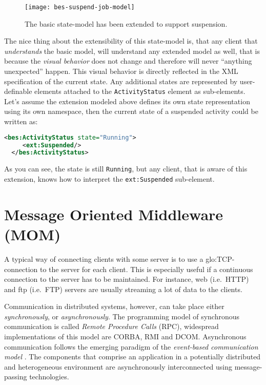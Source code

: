 \begin{figure}[h]
  \centering
  \texttt{[image: bes-suspend-job-model]}
  \caption[Extended  BES Job-State-Model]{The  basic state-model  has been
    extended to support suspension.}
  \label{fig:bes-suspend-model}
\end{figure}

The nice  thing about the extensibility  of this state-model  is, that any
client  that  \emph{understands}  the  basic model,  will  understand  any
extended model  as well, that  is because the \emph{visual  behavior} does
not change  and therefore will never ``anything  unexpected'' happen. This
visual  behavior is  directly reflected  in the  XML specification  of the
current state.   Any additional  states are represented  by user-definable
elements attached to  the \texttt{ActivityStatus} element as sub-elements.
Let's  assume   the  extension  modeled   above  defines  its   own  state
representation  using its  own  namespace,  then the  current  state of  a
suspended activity could be written as:

\begin{lstlisting}[language=XML]
  <bes:ActivityStatus state="Running">
     <ext:Suspended/>
  </bes:ActivityStatus>
\end{lstlisting}

As you can see, the state  is still \texttt{Running}, but any client, that
is   aware    of   this   extension,   knows   how    to   interpret   the
\texttt{ext:Suspended} sub-element.

\section[Message Oriented Middleware]{Message Oriented Middleware (MOM)}
\label{sec:fundamentals:mom}

A  typical  way  of connecting  clients  with  some  server  is to  use  a
\gls{glo:TCP}-connection to the server for each client. This is especially
useful if a continuous connection to  the server has to be maintained. For
instance, web (i.e.~HTTP) and ftp (i.e.~FTP) servers are usually streaming
a lot of data to the clients.

Communication  in  distributed systems,  however,  can  take place  either
\emph{synchronously}, or  \emph{asynchronously}. The programming  model of
synchronous communication  is called \emph{Remote  Procedure Calls} (RPC),
widespread  implementations  of  this  model  are  CORBA,  RMI  and  DCOM.
Asynchronous   communication  follows   the  emerging   paradigm   of  the
\emph{event-based  communication  model}  \cite{MeCa:2005:Taxonomy}.   The
components that  comprise an application in a  potentially distributed and
heterogeneous   environment   are   asynchronously  interconnected   using
message-passing technologies.

